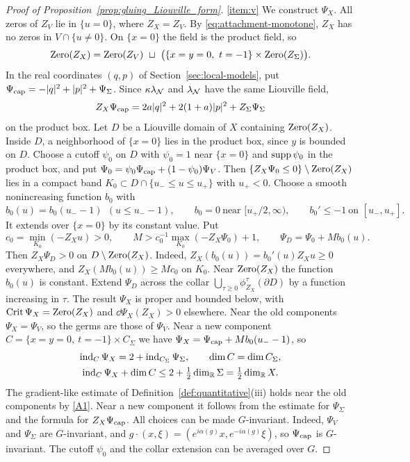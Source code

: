\documentclass[12pt, letter]{amsart}
\theoremstyle{definition}
\begin{document}
\begin{proof}[Proof of Proposition~\ref{prop:gluing_Liouville_form}]
\ref{item:v} We construct $\Psi_X$.
All zeros of $Z_V$ lie in $\{u=0\}$, where $Z_X=Z_V$.
By \eqref{eq:attachment-monotone}, $Z_X$ has no zeros in $V\cap\{u\ne0\}$.
On $\{x=0\}$ the field is the product field, so
\[
 \Zero(Z_X)=\Zero(Z_V)\ \sqcup\ \bigl(\{x=y=0,\ t=-1\}\times\Zero(Z_\Sigma)\bigr).
\]
In the real coordinates $(q,p)$ of Section~\ref{sec:local-models}, put $\Psi_{\mathrm{cap}}=-|q|^2+|p|^2+\Psi_\Sigma$.
Since $\kappa\lambda_{\mathcal{N}}$ and $\lambda_{\mathcal{N}}$ have the same Liouville field,
\[
 Z_X\Psi_{\mathrm{cap}}=2a|q|^2+2(1+a)|p|^2+Z_\Sigma\Psi_\Sigma
\]
on the product box.
Let $D$ be a Liouville domain of $X$ containing $\operatorname{Zero}(Z_X)$.
Inside $D$, a neighborhood of $\{x=0\}$ lies in the product box, since $y$ is bounded on $D$.
Choose a cutoff $\psi_0$ on $D$ with $\psi_0=1$ near $\{x=0\}$ and $\operatorname{supp}\psi_0$ in the product box, and put $\Psi_0=\psi_0\Psi_{\mathrm{cap}}+(1-\psi_0)\Psi_V$.
Then $\{Z_X\Psi_0\le0\}\setminus\operatorname{Zero}(Z_X)$ lies in a compact band $K_0\subset D\cap\{u_-\le u\le u_+\}$ with $u_+<0$.
Choose a smooth nonincreasing function $b_0$ with
\[
 b_0(u)=b_0(u_--1)\ \ (u\le u_--1),\qquad b_0=0\ \text{near }[u_+/2,\infty),\qquad b_0'\le-1\ \text{on }[u_-,u_+].
\]
It extends over $\{x=0\}$ by its constant value.
Put
\[
 c_0=\min_{K_0}(-Z_Xu)>0,\qquad M>c_0^{-1}\max_{K_0}(-Z_X\Psi_0)+1,\qquad \Psi_D=\Psi_0+Mb_0(u).
\]
Then $Z_X\Psi_D>0$ on $D\setminus\operatorname{Zero}(Z_X)$.
Indeed, $Z_X(b_0(u))=b_0'(u)Z_Xu\ge0$ everywhere, and $Z_X(Mb_0(u))\ge Mc_0$ on $K_0$.
Near $\operatorname{Zero}(Z_X)$ the function $b_0(u)$ is constant.
Extend $\Psi_D$ across the collar $\bigcup_{\tau\ge0}\phi_{Z_X}^\tau(\partial D)$ by a function increasing in $\tau$.
The result $\Psi_X$ is proper and bounded below, with $\operatorname{Crit}\Psi_X=\operatorname{Zero}(Z_X)$ and $\dd\Psi_X(Z_X)>0$ elsewhere.
Near the old components $\Psi_X=\Psi_V$, so the germs are those of $\Psi_V$.
Near a new component $C=\{x=y=0,\ t=-1\}\times C_\Sigma$ we have $\Psi_X=\Psi_{\mathrm{cap}}+Mb_0(u_--1)$, so
\[
 \begin{gathered}
 \operatorname{ind}_C\Psi_X=2+\operatorname{ind}_{C_\Sigma}\Psi_\Sigma,\qquad\dim C=\dim C_\Sigma,\\
 \operatorname{ind}_C\Psi_X+\dim C\le2+\tfrac12\dim_{\mathbb{R}}\Sigma=\tfrac12\dim_{\mathbb{R}} X .
 \end{gathered}
\]
The gradient-like estimate of Definition~\ref{def:quantitative}(iii) holds near the old components by \ref{A1}.
Near a new component it follows from the estimate for $\Psi_\Sigma$ and the formula for $Z_X\Psi_{\mathrm{cap}}$.
All choices can be made $G$-invariant.
Indeed, $\Psi_V$ and $\Psi_\Sigma$ are $G$-invariant, and $g\cdot(x,\xi)=(e^{i\alpha(g)}x,e^{-i\alpha(g)}\xi)$, so $\Psi_{\mathrm{cap}}$ is $G$-invariant.
The cutoff $\psi_0$ and the collar extension can be averaged over $G$.


\end{proof}
\end{document}
